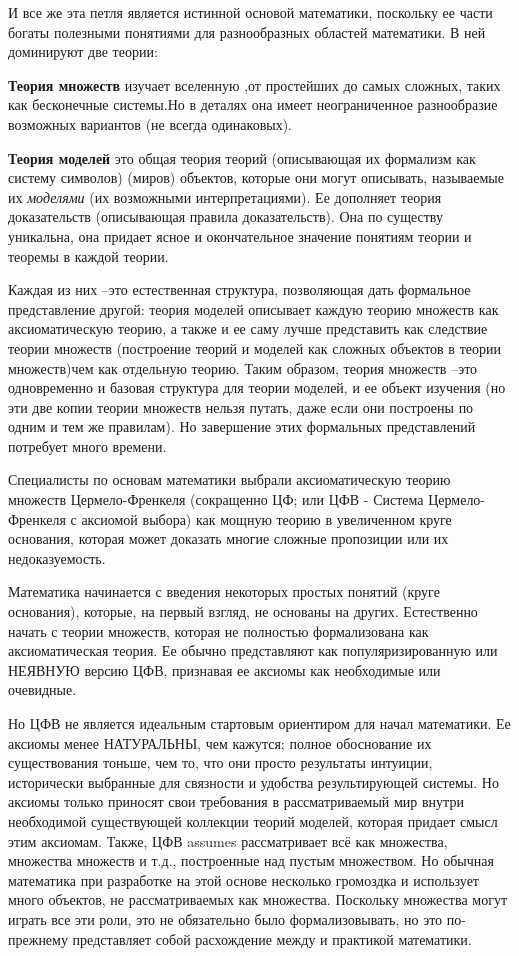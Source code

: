 И все же эта петля является истинной основой математики, поскольку ее части богаты полезными понятиями для разнообразных областей математики. 
В ней доминируют две теории: 
 
{\bf Теория множеств} изучает вселенную ,от простейших до самых сложных, таких как бесконечные системы.Но в деталях она имеет неограниченное разнообразие возможных вариантов (не всегда одинаковых).

 
{\bf Теория моделей} это общая теория теорий (описывающая их формализм как систему символов) (миров) объектов, которые они могут описывать, называемые их {\it моделями} (их возможными интерпретациями). Ее дополняет теория доказательств (описывающая правила доказательств). Она по существу уникальна, она придает ясное и окончательное значение понятиям теории и теоремы в каждой теории.  
 
Каждая из них –это естественная структура, позволяющая дать формальное представление другой: теория моделей описывает каждую теорию множеств как аксиоматическую теорию, а также и ее саму лучше представить как следствие теории множеств (построение теорий и моделей как сложных объектов в теории множеств)чем как отдельную теорию. Таким образом, теория множеств –это одновременно и базовая структура для теории моделей, и ее объект изучения (но эти две копии теории множеств нельзя путать, даже если они построены по одним и тем же правилам). Но завершение этих формальных представлений потребует много времени. 

 
Специалисты по основам математики выбрали аксиоматическую теорию множеств Цермело-Френкеля (сокращенно ЦФ; или ЦФВ - Система Цермело-Френкеля с аксиомой выбора) как мощную теорию в увеличенном круге основания, которая может доказать многие сложные пропозиции или их недоказуемость. 
 
Математика начинается с введения некоторых простых понятий (круге основания), которые, на первый взгляд, не основаны на других. Естественно начать с теории множеств, которая не полностью формализована как аксиоматическая теория. 
Ее обычно представляют как популяризированную или НЕЯВНУЮ версию ЦФВ, признавая ее аксиомы как необходимые или очевидные.

Но ЦФВ не является идеальным стартовым ориентиром для начал математики. Ее аксиомы менее НАТУРАЛЬНЫ, чем кажутся; полное обоснование их существования тоньше, чем то, что они просто результаты интуиции, исторически выбранные для связности и удобства результирующей системы. Но аксиомы только приносят свои требования в рассматриваемый мир внутри необходимой существующей коллекции теорий моделей, которая придает смысл этим аксиомам. Также, ЦФВ assumes  рассматривает всё как множества, множества множеств и т.д., построенные над пустым множеством. Но обычная математика при разработке на этой основе несколько громоздка и использует много объектов, не рассматриваемых как множества. Поскольку множества могут играть все эти роли, это не обязательно было формализовывать, но это по-прежнему представляет собой расхождение между   и практикой математики. 



